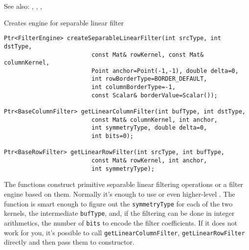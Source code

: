 See also: , , , 

Creates engine for separable linear filter

\begin{lstlisting}
Ptr<FilterEngine> createSeparableLinearFilter(int srcType, int dstType,
                         const Mat& rowKernel, const Mat& columnKernel,
                         Point anchor=Point(-1,-1), double delta=0,
                         int rowBorderType=BORDER_DEFAULT,
                         int columnBorderType=-1,
                         const Scalar& borderValue=Scalar());
                         
Ptr<BaseColumnFilter> getLinearColumnFilter(int bufType, int dstType,
                         const Mat& columnKernel, int anchor,
                         int symmetryType, double delta=0,
                         int bits=0);
                         
Ptr<BaseRowFilter> getLinearRowFilter(int srcType, int bufType,
                         const Mat& rowKernel, int anchor,
                         int symmetryType);
\end{lstlisting}
\begin{description}
\end{description}

The functions construct primitive separable linear filtering operations or a filter engine based on them. Normally it's enough to use  or even higher-level . The function  is smart enough to figure out the \texttt{symmetryType} for each of the two kernels, the intermediate \texttt{bufType}, and, if the filtering can be done in integer arithmetics, the number of \texttt{bits} to encode the filter coefficients. If it does not work for you, it's possible to call \texttt{getLinearColumnFilter}, \texttt{getLinearRowFilter} directly and then pass them to  constructor.


